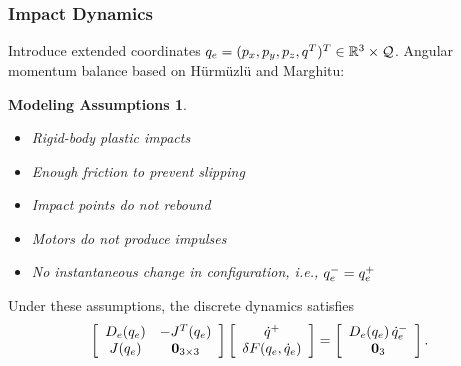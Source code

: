 \documentclass{beamer}
\newtheorem{massump}{Modeling Assumptions}
\begin{document}
\begin{frame}
\begin{columns}
\begin{column}{.45\textwidth}
\begin{figure}
      \end{figure}
    \end{column}
  \end{columns}
\end{frame}

\begin{frame}
  \frametitle{Impact Dynamics}
  Introduce extended coordinates $q_{e} = (p_{x}, p_{y}, p_{z}, q^{T})^{T} \in \mathbb{R}^{3} \times \mathcal{Q}$. Angular momentum balance based on H{\"u}rm{\"u}zl{\"u} and Marghitu:
  \begin{massump}
    \begin{itemize}
    \item Rigid-body plastic impacts
    \item Enough friction to prevent slipping
    \item Impact points do not rebound
    \item Motors do not produce impulses
    \item No instantaneous change in configuration, i.e., $q_{e}^{-} = q_{e}^{+}$
    \end{itemize}
  \end{massump}
  Under these assumptions, the discrete dynamics satisfies
  \begin{align*}
    \left[\begin{array}{c c}
        D_{e}(q_{e}) & -J^{T}(q_{e})\\
        J(q_{e}) & \mathbf{0}_{3 \times 3}
      \end{array}\right]
    \left[\begin{array}{c}
        \dot q^{+}\\
        \delta F(q_{e}, \dot q_{e})
      \end{array}\right]
    = \left[\begin{array}{c c}
        D_{e}(q_{e}) \, \dot q_{e}^{-}\\
        \mathbf{0}_{3}
      \end{array}\right].
  \end{align*}
\end{frame}
\end{document}
